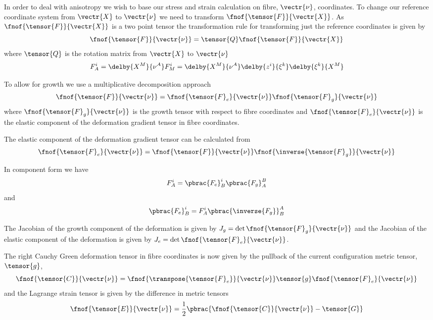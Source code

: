 In order to deal with anisotropy we wish to base our stress and strain
calculation on fibre, $\vectr{\nu}$, coordinates. To change our reference
coordinate system from $\vectr{X}$ to $\vectr{\nu}$ we need to transform
$\fnof{\tensor{F}}{\vectr{X}}$. As $\fnof{\tensor{F}}{\vectr{X}}$ is a two point tensor the transformation
rule for transforming just the reference coordinates is given by
\begin{equation}
\fnof{\tensor{F}}{\vectr{\nu}}=\tensor{Q}\fnof{\tensor{F}}{\vectr{X}}
\end{equation}
where $\tensor{Q}$ is the rotation matrix from $\vectr{X}$ to $\vectr{\nu}$ \ie
\begin{equation}
  F^{i}_{A}=\delby{X^{M}}{\nu^{A}}F^{i}_{M}=\delby{X^{M}}{\nu^{A}}\delby{z^{i}}{\xi^{k}}\delby{\xi^{k}}{X^{M}}
\end{equation}

To allow for growth we use a multiplicative decomposition approach \ie
\begin{equation}
  \fnof{\tensor{F}}{\vectr{\nu}}=\fnof{\tensor{F}_{e}}{\vectr{\nu}}\fnof{\tensor{F}_{g}}{\vectr{\nu}}
\end{equation}
where $\fnof{\tensor{F}_{g}}{\vectr{\nu}}$ is the growth tensor with
respect to fibre coordinates and $\fnof{\tensor{F}_{e}}{\vectr{\nu}}$ is the
elastic component of the deformation gradient tensor in fibre coordinates.

The elastic component of the deformation gradient tensor can be calculated
from
\begin{equation}
  \fnof{\tensor{F}_{e}}{\vectr{\nu}}=\fnof{\tensor{F}}{\vectr{\nu}}\fnof{\inverse{\tensor{F}_{g}}}{\vectr{\nu}}
\end{equation}

In component form we have
\begin{equation}
  F^{i}_{A}=\pbrac{F_{e}}^{i}_{B}\pbrac{F_{g}}^{B}_{A}
\end{equation}
and
\begin{equation}
  \pbrac{F_{e}}^{i}_{B}=F^{i}_{A}\pbrac{\inverse{F_{g}}}^{A}_{B}
\end{equation}

The Jacobian of the growth component of the deformation is given by
$J_{g}=\det{\fnof{\tensor{F}_{g}}{\vectr{\nu}}}$ and the Jacobian of the
elastic component of the deformation is given by
$J_{e}=\det{\fnof{\tensor{F}_{e}}{\vectr{\nu}}}$.

The right Cauchy Green deformation tensor in fibre coordinates is now given by
the pullback of the current configuration metric tensor, $\tensor{g}$,
\begin{equation}
  \fnof{\tensor{C}}{\vectr{\nu}}=\fnof{\transpose{\tensor{F}_{e}}}{\vectr{\nu}}\tensor{g}\fnof{\tensor{F}_{e}}{\vectr{\nu}}
\end{equation}
and the Lagrange strain tensor is given by the difference in metric tensors
\begin{equation}
  \fnof{\tensor{E}}{\vectr{\nu}}=\frac{1}{2}\pbrac{\fnof{\tensor{C}}{\vectr{\nu}}-\tensor{G}}
\end{equation}

